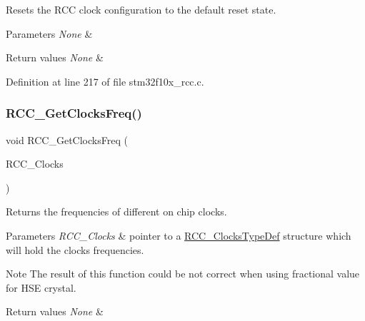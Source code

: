 Resets the R\+CC clock configuration to the default reset state. 


\begin{DoxyParams}{Parameters}
{\em None} & \\
\hline
\end{DoxyParams}

\begin{DoxyRetVals}{Return values}
{\em None} & \\
\hline
\end{DoxyRetVals}


Definition at line 217 of file stm32f10x\+\_\+rcc.\+c.

\mbox{\label{group___r_c_c___exported___functions_ga3e9944fd1ed734275222bbb3e3f29993}} 
\subsubsection{\texorpdfstring{R\+C\+C\+\_\+\+Get\+Clocks\+Freq()}{RCC\_GetClocksFreq()}}
{\footnotesize\ttfamily void R\+C\+C\+\_\+\+Get\+Clocks\+Freq (\begin{DoxyParamCaption}\item[{\hyperlink{struct_r_c_c___clocks_type_def}{R\+C\+C\+\_\+\+Clocks\+Type\+Def} $\ast$}]{R\+C\+C\+\_\+\+Clocks }\end{DoxyParamCaption})}



Returns the frequencies of different on chip clocks. 


\begin{DoxyParams}{Parameters}
{\em R\+C\+C\+\_\+\+Clocks} & pointer to a \hyperlink{struct_r_c_c___clocks_type_def}{R\+C\+C\+\_\+\+Clocks\+Type\+Def} structure which will hold the clocks frequencies. \\
\hline
\end{DoxyParams}
\begin{DoxyNote}{Note}
The result of this function could be not correct when using fractional value for H\+SE crystal. 
\end{DoxyNote}

\begin{DoxyRetVals}{Return values}
{\em None} & \\
\hline
\end{DoxyRetVals}


